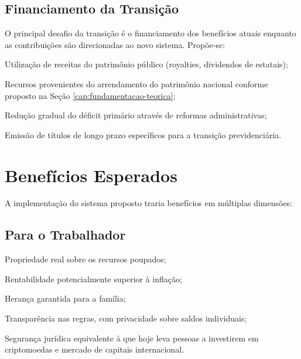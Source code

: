 \begin{figure}[htb]
\end{figure}

\subsection{Financiamento da Transição}

O principal desafio da transição é o financiamento dos benefícios atuais enquanto as contribuições são direcionadas ao novo sistema. Propõe-se:

\begin{alineas}
    \item Utilização de receitas do patrimônio público (royalties, dividendos de estatais);
    \item Recursos provenientes do arrendamento do patrimônio nacional conforme proposto na Seção \ref{cap:fundamentacao-teorica};
    \item Redução gradual do déficit primário através de reformas administrativas;
    \item Emissão de títulos de longo prazo específicos para a transição previdenciária.
\end{alineas}

\section{Benefícios Esperados}

A implementação do sistema proposto traria benefícios em múltiplas dimensões:

\subsection{Para o Trabalhador}

\begin{alineas}
    \item Propriedade real sobre os recursos poupados;
    \item Rentabilidade potencialmente superior à inflação;
    \item Herança garantida para a família;
    \item Transparência nas regras, com privacidade sobre saldos individuais;
    \item Segurança jurídica equivalente à que hoje leva pessoas a investirem em criptomoedas e mercado de capitais internacional.
\end{alineas}

